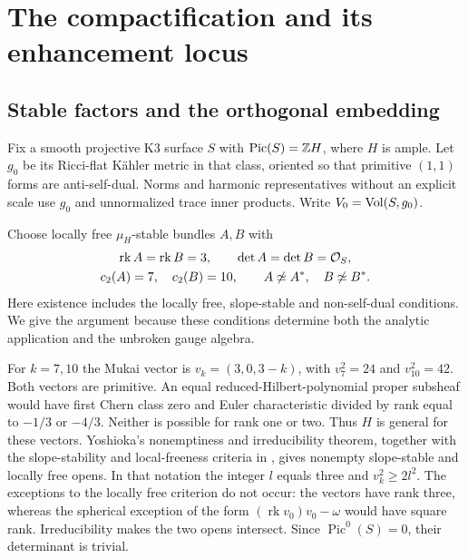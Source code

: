 \section{The compactification and its enhancement locus}\label{sec:compactification}

\subsection{Stable factors and the orthogonal embedding}
Fix a smooth projective K3 surface $S$ with $\operatorname{Pic}(S)=\mathbb Z H$,
where $H$ is ample. Let $g_0$ be its Ricci-flat K\"ahler metric in that
class, oriented so that primitive $(1,1)$ forms are anti-self-dual. Norms
and harmonic representatives without an explicit scale use $g_0$ and
unnormalized trace inner products. Write $V_0=\operatorname{Vol}(S,g_0)$.

Choose locally free $\mu_H$-stable bundles $A,B$ with
\begin{equation}\label{eq:factors}
 \begin{gathered}
 \operatorname{rk}A=\operatorname{rk}B=3,\qquad \det A=\det B=\mathcal O_S,\\
 c_2(A)=7,\quad c_2(B)=10,\qquad A\not\simeq A^*,\quad B\not\simeq B^*.
 \end{gathered}
\end{equation}
Here existence includes the locally free, slope-stable and non-self-dual
conditions. We give the argument because these conditions determine both
the analytic application and the unbroken gauge algebra.

For $k=7,10$ the Mukai vector is $v_k=(3,0,3-k)$, with
$v_7^2=24$ and $v_{10}^2=42$. Both vectors are primitive. An equal
reduced-Hilbert-polynomial proper subsheaf would have first Chern class
zero and Euler characteristic divided by rank equal to $-1/3$ or
$-4/3$. Neither is possible for rank one or two. Thus $H$ is general
for these vectors. Yoshioka's nonemptiness and irreducibility theorem,
together with the slope-stability and local-freeness criteria in
\cite[Theorem~0.1, Proposition~0.5 and section~3.3]{yoshioka}, gives
nonempty slope-stable and locally free opens. In that notation the
integer $l$ equals three and $v_k^2\ge2l^2$. The exceptions to the
locally free criterion do not occur: the vectors have rank three,
whereas the spherical exception of the form
$(\operatorname{rk}v_0)v_0-\omega$ would have square rank.
Irreducibility makes the two opens intersect. Since $\operatorname{Pic}^0(S)=0$,
their determinant is trivial.

